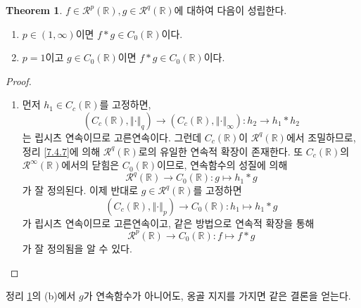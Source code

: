 \documentclass[11pt]{book}
\numberwithin{equation}{chapter}
\def\RR{\mathbb{R}}
\def\calR{\mathcal{R}}
\newcommand{\norm}[1]{\left\Vert#1\right\Vert}
\theoremstyle{definition}
\newtheorem{thm}{Theorem}[section]
\newenvironment{enum}
	{\begin{enumerate}[label=(\alph*), leftmargin=2\parindent]}
	{\end{enumerate}}
\begin{document}
\begin{thm} \label{14.3.6}
    \(f \in \calR^p(\RR), g \in \calR^q(\RR)\)에 대하여 다음이 성립한다.
    \begin{enum}
        \item \(p \in (1, \infty)\)이면 \(f * g \in C_0(\RR)\)이다.
        \item \(p = 1\)이고 \(g \in C_0(\RR)\)이면 \(f * g \in C_0(\RR)\)이다.
    \end{enum}
\end{thm}
\begin{proof}
    \quad

    \begin{enum}
        \item 먼저 \(h_1 \in C_c(\RR)\)를 고정하면,
        \[
            (C_c(\RR), \norm{\cdot}_q) \to (C_c(\RR), \norm{\cdot}_\infty) : h_2 \to h_1 * h_2
        \]
        는 립시츠 연속이므로 고른연속이다. 그런데 \(C_c(\RR)\)이 \(\calR^q(\RR)\)에서 조밀하므로, 정리 \ref{7.4.7}에 의해 \(\calR^q(\RR)\)로의 유일한 연속적 확장이 존재한다. 또 \(C_c(\RR)\)의 \(\calR^\infty(\RR)\)에서의 닫힘은 \(C_0(\RR)\)이므로, 연속함수의 성질에 의해
        \[
            \calR^q(\RR) \to C_0(\RR) : g \mapsto h_1 * g
        \]
        가 잘 정의된다. 이제 반대로 \(g \in \calR^q(\RR)\)를 고정하면
        \[
            (C_c(\RR), \norm{\cdot}_p) \to C_0(\RR) : h_1 \mapsto h_1 * g
        \]
        가 립시츠 연속이므로 고른연속이고, 같은 방법으로 연속적 확장을 통해
        \[
            \calR^p(\RR) \to C_0(\RR) : f \mapsto f * g
        \]
        가 잘 정의됨을 알 수 있다.
    \end{enum}
\end{proof}

정리 \ref{14.3.6}의 (b)에서 \(g\)가 연속함수가 아니어도, 옹골 지지를 가지면 같은 결론을 얻는다.
\end{document}

